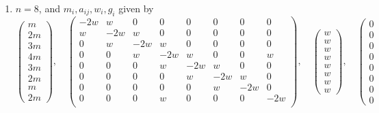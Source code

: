 \begin{lemma}
\begin{enumerate}
$$\begin{matrix}
0 \\
0 \\
0 \\
0 \\
0 \\
0 \\
0
\end{matrix}
\right)
$$
with $w$ and $m$ arbitrary,
\item
\label{models-item-E7-completed}
$n = 8$, and $m_i, a_{ij}, w_i, g_i$ given by
$$
\left(
\begin{matrix}
m \\
2m \\
3m \\
4m \\
3m \\
2m \\
m \\
2m
\end{matrix}
\right),
\quad
\left(
\begin{matrix}
-2w & w & 0 & 0 & 0 & 0 & 0 & 0 \\
w & -2w & w & 0 & 0 & 0 & 0 & 0 \\
0 & w & -2w & w & 0 & 0 & 0 & 0 \\
0 & 0 & w & -2w & w & 0 & 0 & w \\
0 & 0 & 0 & w & -2w & w & 0 & 0 \\
0 & 0 & 0 & 0 & w & -2w & w & 0 \\
0 & 0 & 0 & 0 & 0 & w & -2w & 0 \\
0 & 0 & 0 & w & 0 & 0 & 0 & -2w \\
\end{matrix}
\right),
\quad
\left(
\begin{matrix}
w \\
w \\
w \\
w \\
w \\
w \\
w \\
w
\end{matrix}
\right),
\quad
\left(
\begin{matrix}
0 \\
0 \\
0 \\
0 \\
0 \\
0 \\
0 \\
0
\end{matrix}
$$
\end{enumerate}
\end{lemma}
